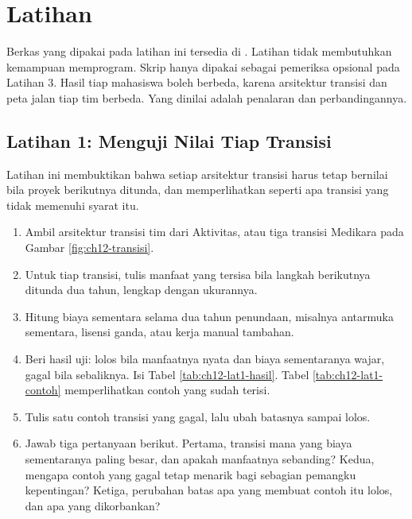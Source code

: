 \section{Latihan}

Berkas yang dipakai pada latihan ini tersedia di .
Latihan tidak membutuhkan kemampuan memprogram. Skrip
 hanya dipakai sebagai pemeriksa
opsional pada Latihan 3. Hasil tiap mahasiswa boleh berbeda, karena arsitektur
transisi dan peta jalan tiap tim berbeda. Yang dinilai adalah penalaran dan
perbandingannya.

\subsection*{Latihan 1: Menguji Nilai Tiap Transisi}

Latihan ini membuktikan bahwa setiap arsitektur transisi harus tetap bernilai
bila proyek berikutnya ditunda, dan memperlihatkan seperti apa transisi yang
tidak memenuhi syarat itu.

\begin{enumerate}
  \item Ambil arsitektur transisi tim dari Aktivitas, atau tiga transisi
        Medikara pada Gambar \ref{fig:ch12-transisi}.
  \item Untuk tiap transisi, tulis manfaat yang tersisa bila langkah berikutnya
        ditunda dua tahun, lengkap dengan ukurannya.
  \item Hitung biaya sementara selama dua tahun penundaan, misalnya antarmuka
        sementara, lisensi ganda, atau kerja manual tambahan.
  \item Beri hasil uji: lolos bila manfaatnya nyata dan biaya sementaranya
        wajar, gagal bila sebaliknya. Isi Tabel \ref{tab:ch12-lat1-hasil}.
        Tabel \ref{tab:ch12-lat1-contoh} memperlihatkan contoh yang sudah
        terisi.
  \item Tulis satu contoh transisi yang gagal, lalu ubah batasnya sampai lolos.
  \item Jawab tiga pertanyaan berikut. Pertama, transisi mana yang biaya
        sementaranya paling besar, dan apakah manfaatnya sebanding? Kedua,
        mengapa contoh yang gagal tetap menarik bagi sebagian pemangku
        kepentingan? Ketiga, perubahan batas apa yang membuat contoh itu lolos,
        dan apa yang dikorbankan?
\end{enumerate}

